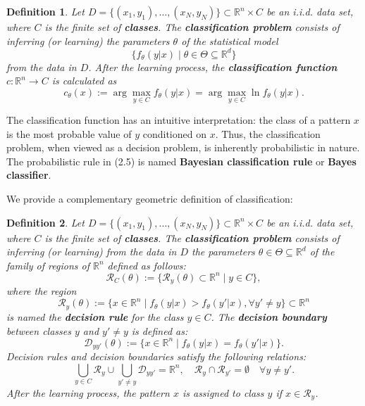 \documentclass{report}
\newtheorem{definition}{Definition}[chapter]
\begin{document}
\begin{definition}
Let $D = \{(x_1,y_1),\dots,(x_N,y_N)\} \subset \mathbb{R}^n \times C$ be an i.i.d. data set, where $C$ is the finite set of \textbf{classes}. The \textbf{classification problem} consists of inferring (or learning) the parameters $\theta$ of the statistical model
\begin{equation}
\{f_\theta(y|x) \mid \theta \in \Theta \subseteq \mathbb{R}^d\}
\end{equation}
from the data in $D$. After the learning process, the \textbf{classification function} $c : \mathbb{R}^n \to C$ is calculated as
\begin{equation}
c_\theta(x) := \arg \max_{y \in C} f_\theta(y|x) = \arg \max_{y \in C} \ln f_\theta(y|x).
\end{equation}
\end{definition}

The classification function has an intuitive interpretation: the class of a pattern $x$ is the most probable value of $y$ conditioned on $x$. Thus, the classification problem, when viewed as a decision problem, is inherently probabilistic in nature. The probabilistic rule in (2.5) is named \textbf{Bayesian classification rule} or \textbf{Bayes classifier}.

We provide a complementary geometric definition of classification:

\begin{definition}
Let $D = \{(x_1,y_1),\dots,(x_N,y_N)\} \subset \mathbb{R}^n \times C$ be an i.i.d. data set, where $C$ is the finite set of \textbf{classes}. The \textbf{classification problem} consists of inferring (or learning) from the data in $D$ the parameters $\theta \in \Theta \subseteq \mathbb{R}^d$ of the family of regions of $\mathbb{R}^n$ defined as follows:
\begin{equation}
\mathcal{R}_C(\theta) := \{\mathcal{R}_y(\theta) \subset \mathbb{R}^n \mid y \in C\},
\end{equation}
where the region
\begin{equation}
\mathcal{R}_y(\theta) := \{x \in \mathbb{R}^n \mid f_\theta(y|x) > f_\theta(y'|x), \forall y' \neq y\} \subset \mathbb{R}^n
\end{equation}
is named the \textbf{decision rule} for the class $y \in C$. The \textbf{decision boundary} between classes $y$ and $y' \neq y$ is defined as:
\begin{equation}
\mathcal{D}_{yy'}(\theta) := \{x \in \mathbb{R}^n \mid f_\theta(y|x) = f_\theta(y'|x)\}.
\end{equation}
Decision rules and decision boundaries satisfy the following relations:
\begin{equation}
\bigcup_{y \in C} \mathcal{R}_y \cup \bigcup_{y' \neq y} \mathcal{D}_{yy'} = \mathbb{R}^n, \quad \mathcal{R}_y \cap \mathcal{R}_{y'} = \emptyset \quad \forall y \neq y'.
\end{equation}
After the learning process, the pattern $x$ is assigned to class $y$ if $x \in \mathcal{R}_y$.
\end{definition}
\end{document}
